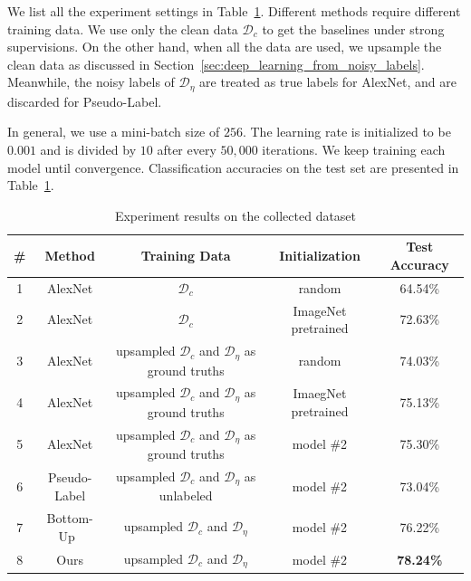 \documentclass[10pt,twocolumn,letterpaper]{article}
\begin{document}
We list all the experiment settings in Table~\ref{tab:exp}. Different methods require different training data. We use only the clean data $\mathcal{D}_c$ to get the baselines under strong supervisions. On the other hand, when all the data are used, we upsample the clean data as discussed in Section~\ref{sec:deep_learning_from_noisy_labels}. Meanwhile, the noisy labels of $\mathcal{D}_{\eta}$ are treated as true labels for AlexNet, and are discarded for Pseudo-Label.

In general, we use a mini-batch size of $256$. The learning rate is initialized to be $0.001$ and is divided by $10$ after every $50,000$ iterations. We keep training each model until convergence. Classification accuracies on the test set are presented in Table~\ref{tab:exp}.

\begin{table}[t]
\begin{center}
\begin{tabular}{c|c|c|c|c}
\hline
\# & Method & Training Data & Initialization & Test Accuracy\\
\hline\hline
1 & AlexNet & $\mathcal{D}_c$ & random & 64.54\% \\
2 & AlexNet & $\mathcal{D}_c$ & ImageNet pretrained & 72.63\% \\
3 & AlexNet & upsampled $\mathcal{D}_c$ and $\mathcal{D}_{\eta}$ as ground truths & random & 74.03\% \\
4 & AlexNet & upsampled $\mathcal{D}_c$ and $\mathcal{D}_{\eta}$ as ground truths & ImaegNet pretrained & 75.13\% \\
5 & AlexNet & upsampled $\mathcal{D}_c$ and $\mathcal{D}_{\eta}$ as ground truths & model \#2 & 75.30\% \\
6 & Pseudo-Label\cite{lee2013pseudo} & upsampled $\mathcal{D}_c$ and $\mathcal{D}_{\eta}$ as unlabeled & model \#2 & 73.04\% \\
7 & Bottom-Up~\cite{sukhbaatar2014learning} & upsampled $\mathcal{D}_c$ and $\mathcal{D}_{\eta}$ & model \#2 & 76.22\% \\
8 & Ours & upsampled $\mathcal{D}_c$ and $\mathcal{D}_{\eta}$ & model \#2 & \textbf{78.24\%} \\
\hline
\end{tabular}
\end{center}
\caption{Experiment results on the collected dataset}
\label{tab:exp}
\end{table}
\end{document}
